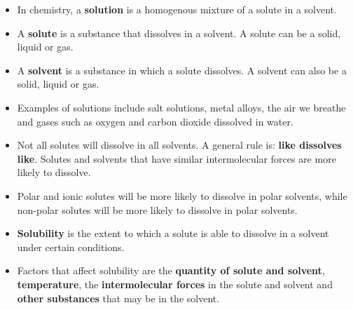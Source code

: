 
\begin{itemize}
\item{In chemistry, a \textbf{solution} is a homogenous mixture of a solute in a solvent.}
\item{A \textbf{solute} is a substance that dissolves in a solvent. A solute can be a solid, liquid or gas.}
\item{A \textbf{solvent} is a substance in which a solute dissolves. A solvent can also be a solid, liquid or gas.}
\item{Examples of solutions include salt solutions, metal alloys, the air we breathe and gases such as oxygen and carbon dioxide dissolved in water.}
\item{Not all solutes will dissolve in all solvents. A general rule is: \textbf{like dissolves like}. Solutes and solvents that have similar intermolecular forces are more likely to dissolve.}
\item{Polar and ionic solutes will be more likely to dissolve in polar solvents, while non-polar solutes will be more likely to dissolve in polar solvents.}
\item{\textbf{Solubility} is the extent to which a solute is able to dissolve in a solvent under certain conditions.}
\item{Factors that affect solubility are the \textbf{quantity of solute and solvent}, \textbf{temperature}, the \textbf{intermolecular forces} in the solute and solvent and \textbf{other substances} that may be in the solvent.}
\end{itemize}


